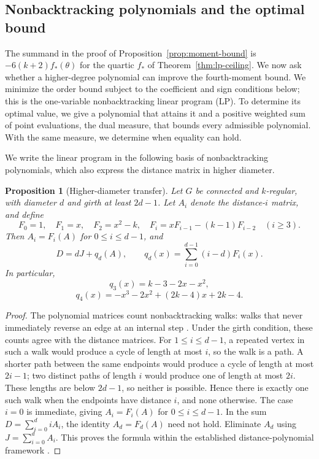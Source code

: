 \documentclass[a4paper,10pt,reqno]{amsart}
\theoremstyle{plain}
\newtheorem{proposition}[theorem]{Proposition}
\theoremstyle{definition}
\theoremstyle{remark}
\begin{document}
\subsection{Nonbacktracking polynomials and the optimal bound}

The summand in the proof of Proposition~\ref{prop:moment-bound} is \(-6(k+2)f_*(\theta)\) for the quartic \(f_*\) of
Theorem~\ref{thm:lp-ceiling}. We now ask whether a higher-degree polynomial
can improve the fourth-moment bound. We minimize the order
bound subject to the coefficient and sign conditions below; this is the
one-variable nonbacktracking linear program (LP). To determine its optimal
value, we give a polynomial that attains it and a positive weighted sum of
point evaluations, the dual measure, that bounds every admissible polynomial. With the
same measure, we determine when equality can hold.

We write the linear program in the following basis of nonbacktracking
polynomials, which also express the distance matrix in higher diameter.

\begin{proposition}[Higher-diameter transfer]\label{prop:higher-transfer}
Let \(G\) be connected and \(k\)-regular, with diameter \(d\) and girth at
least \(2d-1\).  Let \(A_i\) denote the distance-\(i\) matrix, and define
\[
 F_0=1,
 \quad F_1=x,
 \quad F_2=x^2-k,
 \quad F_i=xF_{i-1}-(k-1)F_{i-2}\quad(i\ge3).
\]
Then \(A_i=F_i(A)\) for \(0\le i\le d-1\), and
\[
 D=dJ+q_d(A),
 \qquad
 q_d(x)=\sum_{i=0}^{d-1}(i-d)F_i(x).
\]
In particular,
\[
 q_3(x)=k-3-2x-x^2,
\]
\[
 q_4(x)=-x^3-2x^2+(2k-4)x+2k-4.
\]
\end{proposition}

\begin{proof}
The polynomial matrices count nonbacktracking walks: walks that never immediately
reverse an edge at an internal step \cite[Theorem~1]{Nozaki2015}.
Under the girth condition, these counts agree with the distance matrices. For
\(1\le i\le d-1\), a repeated vertex in such a walk would produce a
cycle of length at most \(i\), so the walk is a path. A shorter path
between the same endpoints would produce a cycle of length at most
\(2i-1\); two distinct paths of length \(i\) would produce one of length
at most \(2i\). These lengths are below \(2d-1\), so neither is
possible. Hence there is exactly one such walk when the endpoints have
distance \(i\), and none otherwise. The case \(i=0\) is immediate,
giving \(A_i=F_i(A)\) for \(0\le i\le d-1\).
In the sum \(D=\sum_{i=0}^d iA_i\), the identity \(A_d=F_d(A)\) need not hold.
Eliminate \(A_d\) using \(J=\sum_{i=0}^d A_i\).
This proves the formula within the established distance-polynomial
framework \cite{HowladerPanigrahi2022,Fiol2016}.
\end{proof}
\end{document}
